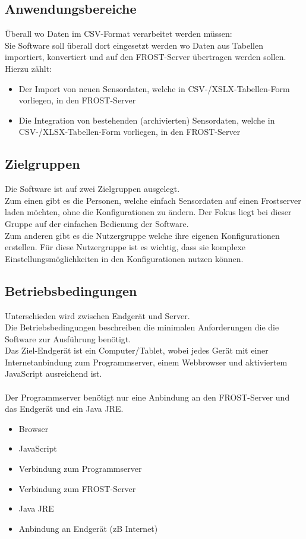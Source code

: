 \documentclass[12 pt]{article}
\begin{document}
\subsection{Anwendungsbereiche}
Überall wo Daten im CSV-Format verarbeitet werden müssen: \\
Sie Software soll überall dort eingesetzt werden wo Daten aus Tabellen importiert, konvertiert und auf den FROST-Server übertragen werden sollen. \\
Hierzu zählt:
\begin{itemize}
\item Der Import von neuen Sensordaten, welche in CSV-/XSLX-Tabellen-Form vorliegen, in den FROST-Server
\item Die Integration von bestehenden (archivierten) Sensordaten, welche in CSV-/XLSX-Tabellen-Form vorliegen, in den FROST-Server
\end{itemize}

\subsection{Zielgruppen}
Die Software ist auf zwei Zielgruppen ausgelegt.\\
Zum einen gibt es die Personen, welche einfach Sensordaten auf einen Frostserver laden möchten,  ohne die Konfigurationen zu ändern. Der Fokus liegt bei dieser Gruppe auf der einfachen Bedienung der Software.\\
Zum anderen gibt es die Nutzergruppe welche ihre eigenen Konfigurationen erstellen. Für diese Nutzergruppe ist es wichtig, dass sie komplexe Einstellungsmöglichkeiten in den Konfigurationen nutzen können.

\subsection{Betriebsbedingungen}
Unterschieden wird zwischen Endgerät und Server. \\
Die Betriebsbedingungen beschreiben die minimalen Anforderungen die die Software zur Ausführung benötigt. \\
Das Ziel-Endgerät ist ein Computer/Tablet, wobei jedes Gerät mit einer Internetanbindung zum Programmserver, einem Webbrowser und aktiviertem JavaScript ausreichend ist.\\
\ \\
Der Programmserver benötigt nur eine Anbindung an den FROST-Server und das Endgerät und ein Java JRE.
\begin{itemize}
	\item Browser
	\item JavaScript
	\item Verbindung zum Programmserver
\end{itemize}
\begin{itemize}
	\item Verbindung zum FROST-Server
	\item Java JRE
	\item Anbindung an Endgerät (zB Internet)
\end{itemize}
\end{document}
